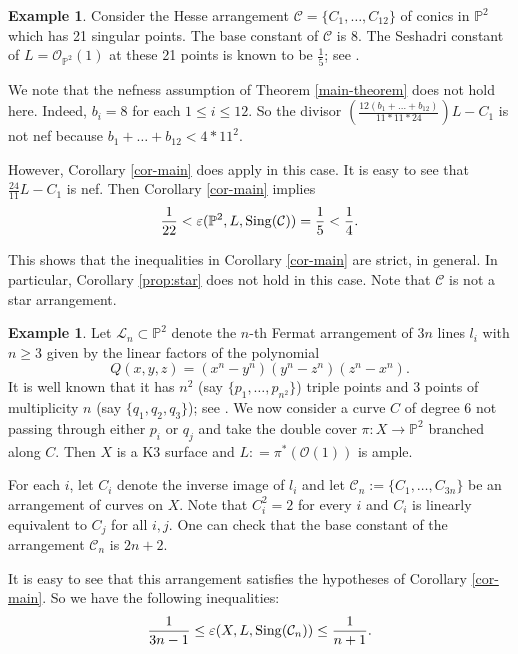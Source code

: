 \documentclass[12pt,reqno]{amsart}
\theoremstyle{plain}
\numberwithin{equation}{section}
\theoremstyle{definition}
\newtheorem{example}[theorem]{Example}
\begin{document}
\begin{example}
Consider the Hesse arrangement $\mathcal{C} = \{C_1, \ldots, C_{12}\}$  of conics in $\mathbb{P}^2$
which has 21 singular points.  The base constant of $\mathcal{C}$  is 8.  
 The Seshadri constant of $L = \mathcal{O}_{\mathbb{P}^2}(1)$ at these 21 points is known to be $\frac{1}{5}$; see \cite[Example 3.5]{JP}. 

We note that the nefness assumption of Theorem \ref{main-theorem} does not hold here. Indeed, $b_i = 8$ for each $1 \le i \le 12$. So the divisor 
$\left(\frac{12(b_1+\dots + b_{12})}{11*11*24}\right)L - C_1$ is not nef because 
$b_1+\dots + b_{12} < 4*11^2$. 

However, Corollary \ref{cor-main} does apply in this case. 
It is easy to see that $\frac{24}{11}L - C_1$ is nef. 
Then Corollary \ref{cor-main} implies
$$\frac{1}{22} <  \varepsilon(\mathbb{P}^2, L,{\rm Sing}(\mathcal{C})) = \frac{1}{5}<  \frac{1}{4}.$$

This shows that the inequalities in Corollary \ref{cor-main} are strict, in general. In particular,  Corollary \ref{prop:star} does not hold in this case. Note that $\mathcal{C}$ is not a star arrangement.   





\end{example}



\begin{example}
		Let $\mathcal{L}_n \subset \mathbb{P}^2$ denote the $n$-th Fermat arrangement of $3n$ lines $l_i$ with $n \geq 3$ given by the linear factors of the polynomial 
		\[
		Q(x,y,z)=(x^n-y^n)(y^n-z^n)(z^n-x^n).
		\]
		It is well known that it has $n^2$ (say $\{p_1,\ldots,p_{n^2}\}$) triple points and $3$ points of multiplicity $n$ (say $\{q_1,q_2,q_3\}$); see \cite[Example II.6]{U}.  We now consider a 
		curve $C$ of degree $6$ not passing through either $p_i$ or $q_j$ and take the double cover 
				$\pi : X \longrightarrow \mathbb{P}^2$
		branched along $C$. Then $X$ is a K3 surface  and $L : = \pi^*(\mathcal{O}(1))$ is ample. 

For each $i$, let $C_i$ denote the inverse image of $l_i$ and let 
$\mathcal{C}_n := \{C_1,\ldots, C_{3n}\}$ be an arrangement of curves on $X$. Note that $C_i^2 = 2$ for every $i$ and 
$C_i$ is linearly equivalent to $C_j$ for all $i,j$. 
One can check that the base constant of the arrangement $\mathcal{C}_n$ is $2n+2$. 

It is easy to see that this arrangement satisfies the hypotheses of Corollary \ref{cor-main}. 
So we have the following inequalities:
$$\frac{1}{3n-1} \le \varepsilon(X, L,{\rm Sing}(\mathcal{C}_n)) \le \frac{1}{n+1}.$$



\end{example}
\end{document}
